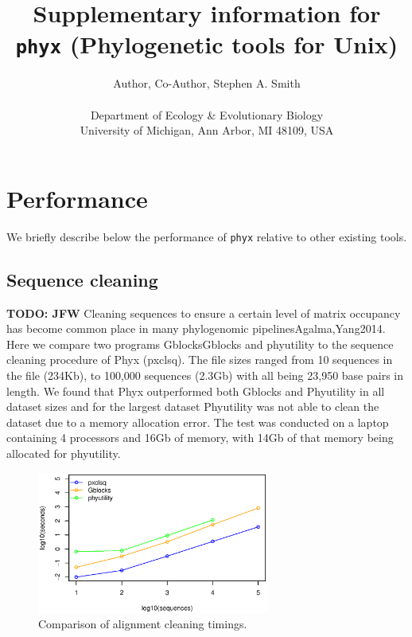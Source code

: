 \documentclass{article}
\begin{document}
\title{Supplementary information for \texttt{phyx} (Phylogenetic tools for Unix)}

\author{Author, Co-Author, Stephen A. Smith\\\\
\normalsize{Department of Ecology \& Evolutionary Biology}\\
\normalsize{University of Michigan, Ann Arbor, MI 48109, USA}}
\date{} %
\maketitle

\section{Performance}
We briefly describe below the performance of \texttt{phyx} relative to other
existing tools.

\subsection{Sequence cleaning}
\textbf{TODO: JFW} Cleaning sequences to ensure a certain level
of matrix occupancy has become common place in many phylogenomic
pipelines{Agalma,Yang2014}. Here we compare two programs Gblocks{Gblocks}
and phyutility \cite{SmithDunn2008} to the sequence cleaning procedure of
Phyx (pxclsq). The file sizes ranged from 10 sequences in the file (234Kb), to 100,000
sequences (2.3Gb) with all being 23,950 base pairs in length. We found that Phyx outperformed both Gblocks and Phyutility in all dataset sizes and for the largest
dataset Phyutility was not able to clean the dataset due to a
memory allocation error. The test was conducted on a laptop 
containing 4 processors and 16Gb of memory, with 14Gb of that
memory being allocated for phyutility.

\begin{figure}[!h]
    \centering
    \includegraphics[width=3.0in]{clsq}
    \caption{Comparison of alignment cleaning timings.}
    \label{cleaningfigure}
\label{fig:S1}
\end{figure}
\end{document}
